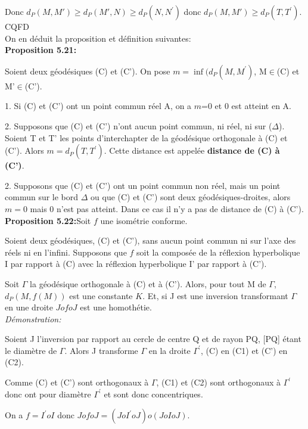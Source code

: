 \documentclass[a4paper, 12pt, twoside]{book}
\begin{document}
  Donc $d_{P}(M, M')\geq d_{P}(M', N) \geq d_{P}(N, N^{'})$ donc $d_{P}(M, M')\geq d_{P}(T, T^{'})$. CQFD\\
  
  On en déduit la proposition et définition suivantes:\\
  
  \textbf{Proposition 5.21:}\
  
   Soient deux géodésiques (C) et (C'). On pose $m=\inf(d_{P}(M, M^{'})$, M$\in$(C) et M'$\in$(C').\
   
   1. Si (C) et (C') ont un point commun réel A, on a $m$=0 et 0 est atteint en A.\
  
   2. Supposons que (C) et (C') n'ont aucun  point commun, ni réel, ni sur ($\Delta$). Soient T et T' les points d'interchapter de la géodésique orthogonale à (C) et (C'). Alors $m=d_{P}(T, T^{'})$. Cette distance est appelée \textbf{distance de (C) à (C')}.\
  
  2. Supposons que  (C) et (C') ont un point commun non réel, mais un point commun sur le bord $\Delta$ ou que (C) et (C') sont deux géodésiques-droites, alors $m=0$ mais 0 n'est pas atteint. Dans ce cas il n'y a pas de distance de (C) à (C').\\
  
 \textbf{Proposition 5.22:}Soit $f$ une isométrie conforme.\
  
   Soient  deux géodésiques, (C) et (C'), sans aucun point commun  ni sur l'axe des réels ni en l'infini. Supposons que $f$ soit la composée de la réflexion hyperbolique I par rapport à (C) avec la réflexion hyperbolique I' par rapport à (C'). \
   
   Soit  $\Gamma$ la géodésique orthogonale à (C) et à (C'). Alors, pour tout M de $\Gamma$, $d_{P}(M, f(M))$ est une constante $K$. Et, si J est une inversion transformant $\Gamma$ en une droite $JofoJ$ est une homothétie.\\
   
 \textit{Démonstration:}\
 
 Soient J l'inversion par rapport au cercle de centre Q et de rayon PQ, [PQ] étant le diamètre de $\Gamma$. Alors J transforme $\Gamma$ en la droite $\Gamma^
 {'}$, (C) en (C1) et (C') en (C2). \
 
 Comme (C) et (C') sont orthogonaux à $\Gamma$, (C1) et (C2) sont orthogonaux à $\Gamma^{'}$ donc ont pour diamètre $\Gamma^{'}$ et sont donc concentriques.\
 
 On a $f=I^{'}oI$ donc $JofoJ=(JoI^{'}oJ)o(JoIoJ)$.\\
\end{document}
